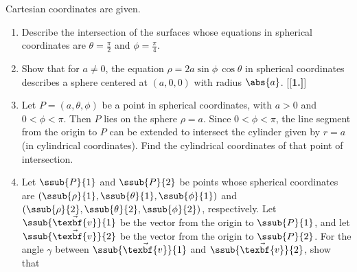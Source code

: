 Cartesian coordinates are given.
\begin{enumerate}[\bfseries 1.]
\par\noindent For Exercises 5-7, write the given equation in (a) cylindrical and (b) spherical coordinates.
[{[\bfseries 1.]}]
\vspace{1mm}
[{[\bfseries 1.]}]
 \item Describe the intersection of the surfaces whose equations in spherical coordinates are $\theta = \frac{\pi}{2}$
  and $\phi = \frac{\pi}{4}$.
 \item Show that for $a \ne 0$, the equation $\rho = 2a \sin \phi \, \cos \theta$ in spherical coordinates describes a
  sphere centered at $(a,0,0)$ with radius $\abs{a}$.
[{[\bfseries 1.]}]
 \item Let $P = (a,\theta,\phi)$ be a point in spherical coordinates, with $a > 0$ and $0 < \phi < \pi$. Then $P$ lies
  on the sphere $\rho = a$. Since $0 < \phi < \pi$, the line segment from the origin to $P$
  can be extended to intersect the cylinder given by $r = a$ (in cylindrical coordinates). Find the cylindrical
  coordinates of that point of intersection.
 \item Let $\ssub{P}{1}$ and $\ssub{P}{2}$ be points whose spherical coordinates are
  $( \ssub{\rho}{1},\ssub{\theta}{1},\ssub{\phi}{1} )$ and $( \ssub{\rho}{2},\ssub{\theta}{2},\ssub{\phi}{2} )$,
  respectively. Let $\ssub{\vec{\texbf{v}}}{1}$ be the vector from the origin to $\ssub{P}{1}$, and let
  $\ssub{\vec{\texbf{v}}}{2}$ be the vector from the origin to $\ssub{P}{2}$. For the angle $\gamma$ between
  $\ssub{\vec{\texbf{v}}}{1}$ and $\ssub{\vec{\texbf{v}}}{2}$, show that
  \begin{displaymath}

\end{displaymath}
\end{enumerate}
